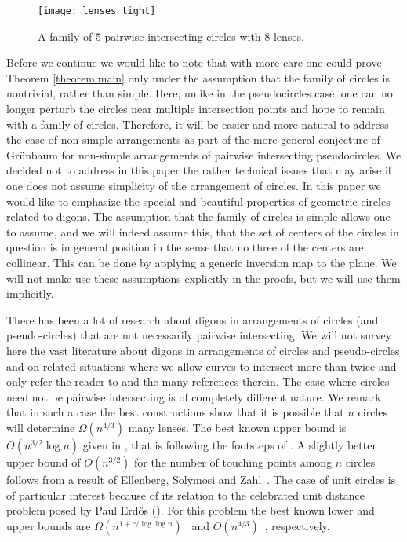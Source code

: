 \documentclass[11pt,a4paper]{article}
\begin{document}
\begin{figure}[ht]
	\centering
	\texttt{[image: lenses\_tight]}
	\caption{A family of $5$ pairwise intersecting circles with $8$ lenses.}
	\label{fig:tight}
\end{figure}

Before we continue we would like to note that with more care one could prove Theorem 
\ref{theorem:main} only under the assumption that the family of circles is nontrivial, rather than simple. Here, unlike in the pseudocircles case, one can no longer perturb the circles near multiple intersection points and hope to remain with a family of circles. Therefore, it will be easier and more natural to address the case of non-simple arrangements as part of the more general conjecture of Gr\"unbaum for non-simple arrangements of pairwise intersecting pseudocircles. We decided not to address in this paper the rather technical issues that may arise if one does not assume simplicity of the arrangement of circles. 
In this paper we would like to emphasize the 
special and beautiful properties of geometric circles related to digons. 
The assumption that the family of circles is simple allows
one to assume, and we will indeed assume this, that the set of centers of the circles in question is in general position in the sense that no three of the centers are collinear.
This can be done by applying a generic inversion map to the plane. We will not make use these assumptions explicitly in the proofs, but we will use them implicitly.

There has been a lot of research about digons in arrangements of circles (and pseudo-circles) that are not necessarily pairwise intersecting. We will not survey here the vast literature about digons in arrangements of circles and pseudo-circles and on related situations where we allow curves to intersect more than twice and only refer the reader to \cite{GOT18} and the many references therein. The case where circles need not be pairwise intersecting is of completely different nature. We remark that in such a case the best constructions show that it is possible that $n$ circles will determine $\Omega(n^{4/3})$ many lenses. The best known upper bound is $O(n^{3/2}\log n)$ given in \cite{MT06}, that is following the footsteps of \cite{PR04}. A slightly better upper bound of $O(n^{3/2})$ for the number of touching points among $n$ circles follows from a result of Ellenberg, Solymosi and Zahl~\cite{ESZ16}. The case of unit circles is of particular interest because of its relation to the celebrated unit distance problem posed by Paul Erd\H os (\cite{Erdos46}). For this problem the best known lower and upper bounds are $\Omega(n^{1+c/\log\log n})$~\cite{Erdos46} and $O(n^{4/3})$~\cite{PT06,SST84,Szekely97}, respectively.   
\end{document}
